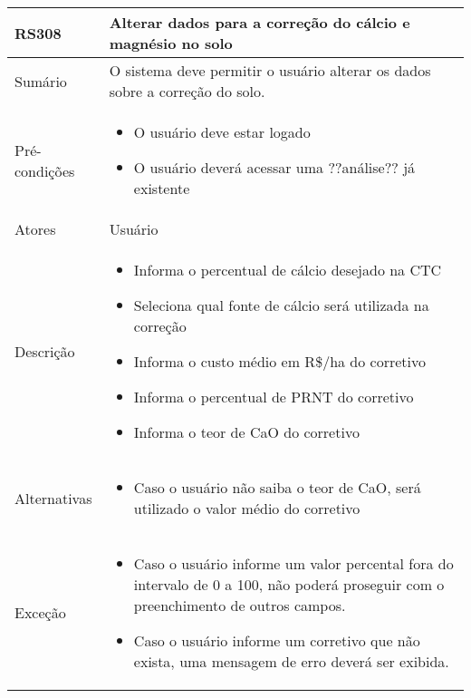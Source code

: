 \begin{quadro}[!htb]
    \begin{tabular}{|p{3cm}|p{11cm}|}
        \hline
        \textbf{RS308} & \textbf{Alterar dados para a correção do cálcio e magnésio no solo} \\
        \hline
        Sumário        & O sistema deve permitir o usuário alterar os dados sobre a correção do solo.                  \\
        \hline
        Pré-condições  & \begin{itemize}
            \item O usuário deve estar logado
            \item O usuário deverá acessar uma ??análise?? já existente 
        \end{itemize}                 \\
        \hline
        Atores         & Usuário                  \\
        \hline
        Descrição      &
        \begin{itemize}
            \item Informa o percentual de cálcio desejado na CTC
            \item Seleciona qual fonte de cálcio será utilizada na correção
            \item Informa o custo médio em R\$/ha do corretivo
            \item Informa o percentual de PRNT do corretivo
            \item Informa o teor de CaO do corretivo
        \end{itemize}                 \\
        \hline
        Alternativas   &
        \begin{itemize}
            \item Caso o usuário não saiba o teor de CaO, será utilizado o valor médio do corretivo
        \end{itemize}                 \\
        \hline
        Exceção        &
        \begin{itemize}
            \item Caso o usuário informe um valor percental fora do intervalo de 0 a 100, não poderá proseguir com o preenchimento de outros campos.
            \item Caso o usuário informe um corretivo que não exista, uma mensagem de erro deverá ser exibida.
        \end{itemize}                   \\
        \hline
    \end{tabular}
\end{quadro}

